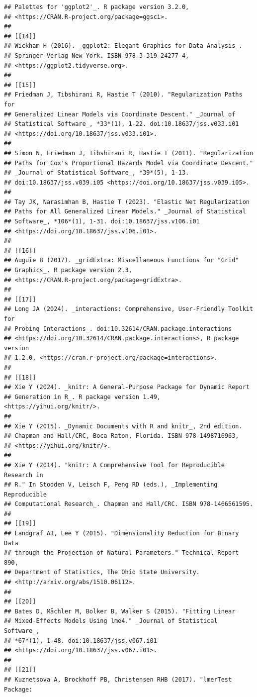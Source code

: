\documentclass[a4paper, nobind]{templates/ociamthesis}
\begin{document}
\begin{verbatim}
## Palettes for 'ggplot2'_. R package version 3.2.0,
## <https://CRAN.R-project.org/package=ggsci>.
## 
## [[14]]
## Wickham H (2016). _ggplot2: Elegant Graphics for Data Analysis_.
## Springer-Verlag New York. ISBN 978-3-319-24277-4,
## <https://ggplot2.tidyverse.org>.
## 
## [[15]]
## Friedman J, Tibshirani R, Hastie T (2010). "Regularization Paths for
## Generalized Linear Models via Coordinate Descent." _Journal of
## Statistical Software_, *33*(1), 1-22. doi:10.18637/jss.v033.i01
## <https://doi.org/10.18637/jss.v033.i01>.
## 
## Simon N, Friedman J, Tibshirani R, Hastie T (2011). "Regularization
## Paths for Cox's Proportional Hazards Model via Coordinate Descent."
## _Journal of Statistical Software_, *39*(5), 1-13.
## doi:10.18637/jss.v039.i05 <https://doi.org/10.18637/jss.v039.i05>.
## 
## Tay JK, Narasimhan B, Hastie T (2023). "Elastic Net Regularization
## Paths for All Generalized Linear Models." _Journal of Statistical
## Software_, *106*(1), 1-31. doi:10.18637/jss.v106.i01
## <https://doi.org/10.18637/jss.v106.i01>.
## 
## [[16]]
## Auguie B (2017). _gridExtra: Miscellaneous Functions for "Grid"
## Graphics_. R package version 2.3,
## <https://CRAN.R-project.org/package=gridExtra>.
## 
## [[17]]
## Long JA (2024). _interactions: Comprehensive, User-Friendly Toolkit for
## Probing Interactions_. doi:10.32614/CRAN.package.interactions
## <https://doi.org/10.32614/CRAN.package.interactions>, R package version
## 1.2.0, <https://cran.r-project.org/package=interactions>.
## 
## [[18]]
## Xie Y (2024). _knitr: A General-Purpose Package for Dynamic Report
## Generation in R_. R package version 1.49, <https://yihui.org/knitr/>.
## 
## Xie Y (2015). _Dynamic Documents with R and knitr_, 2nd edition.
## Chapman and Hall/CRC, Boca Raton, Florida. ISBN 978-1498716963,
## <https://yihui.org/knitr/>.
## 
## Xie Y (2014). "knitr: A Comprehensive Tool for Reproducible Research in
## R." In Stodden V, Leisch F, Peng RD (eds.), _Implementing Reproducible
## Computational Research_. Chapman and Hall/CRC. ISBN 978-1466561595.
## 
## [[19]]
## Landgraf AJ, Lee Y (2015). "Dimensionality Reduction for Binary Data
## through the Projection of Natural Parameters." Technical Report 890,
## Department of Statistics, The Ohio State University.
## <http://arxiv.org/abs/1510.06112>.
## 
## [[20]]
## Bates D, Mächler M, Bolker B, Walker S (2015). "Fitting Linear
## Mixed-Effects Models Using lme4." _Journal of Statistical Software_,
## *67*(1), 1-48. doi:10.18637/jss.v067.i01
## <https://doi.org/10.18637/jss.v067.i01>.
## 
## [[21]]
## Kuznetsova A, Brockhoff PB, Christensen RHB (2017). "lmerTest Package:

\end{verbatim}
\end{document}
